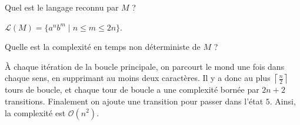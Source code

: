 \begin{exercice}
  \begin{questions}
  \item Quel est le langage reconnu par $M$ ? 
  \end{questions}
  \begin{corrections}
    $\mathcal{L}(M) = \{a^n b^m \mid n\le m \le 2n\}$. 
  \end{corrections}

  \begin{questions}
  \item Quelle est la complexité en temps non déterministe de $M$ ? 
  \end{questions}
  \begin{corrections}
    À chaque itération de la boucle principale, on parcourt le mond une fois dans chaque sens, en supprimant au moins deux caractères.
    Il y a donc au plus $\left\lceil \frac{n}{2} \right\rceil$ tours de boucle, et chaque tour de boucle a une complexité bornée par
    $2n+2$ transitions. Finalement on ajoute une transition pour passer dans l'état $5$.
    Ainsi, la complexité est $\mathcal{O}(n^2)$.
  \end{corrections}

\end{exercice}

\endgroup
\endinput

